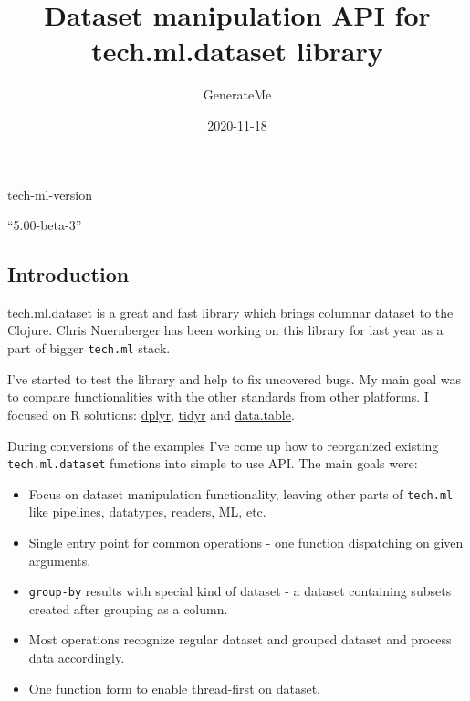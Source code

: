 \documentclass[]{article}
\title{Dataset manipulation API for tech.ml.dataset library}
\author{GenerateMe}
\date{2020-11-18}
\newenvironment{Shaded}{\begin{snugshade}}{\end{snugshade}}
\newcommand{\NormalTok}[1]{#1}
\providecommand{\tightlist}{%
  \setlength{\itemsep}{0pt}\setlength{\parskip}{0pt}}
\begin{document}
\maketitle

\begin{Shaded}
\begin{Highlighting}[]
\NormalTok{tech-ml-version}
\end{Highlighting}
\end{Shaded}

``5.00-beta-3''

\hypertarget{introduction}{%
\subsection{Introduction}\label{introduction}}

\href{https://github.com/techascent/tech.ml.dataset}{tech.ml.dataset} is
a great and fast library which brings columnar dataset to the Clojure.
Chris Nuernberger has been working on this library for last year as a
part of bigger \texttt{tech.ml} stack.

I've started to test the library and help to fix uncovered bugs. My main
goal was to compare functionalities with the other standards from other
platforms. I focused on R solutions:
\href{https://dplyr.tidyverse.org/}{dplyr},
\href{https://tidyr.tidyverse.org/}{tidyr} and
\href{https://rdatatable.gitlab.io/data.table/}{data.table}.

During conversions of the examples I've come up how to reorganized
existing \texttt{tech.ml.dataset} functions into simple to use API. The
main goals were:

\begin{itemize}
\tightlist
\item
  Focus on dataset manipulation functionality, leaving other parts of
  \texttt{tech.ml} like pipelines, datatypes, readers, ML, etc.
\item
  Single entry point for common operations - one function dispatching on
  given arguments.
\item
  \texttt{group-by} results with special kind of dataset - a dataset
  containing subsets created after grouping as a column.
\item
  Most operations recognize regular dataset and grouped dataset and
  process data accordingly.
\item
  One function form to enable thread-first on dataset.
\end{itemize}
\end{document}
